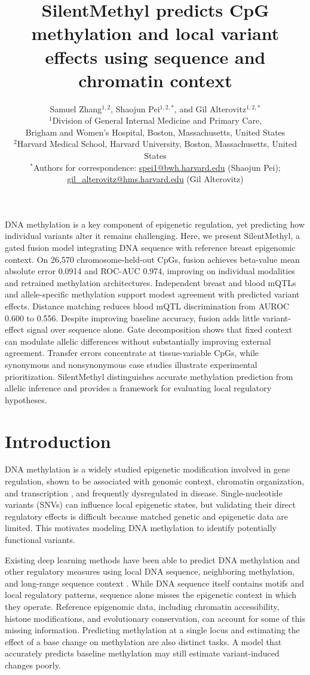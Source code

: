 \documentclass[11pt,letterpaper,twocolumn]{article}
\title{\LARGE\bfseries SilentMethyl predicts CpG methylation and local variant effects using sequence and chromatin context}
\author{%
  Samuel Zhang$^{1,2}$, Shaojun Pei$^{1,2,*}$, and Gil Alterovitz$^{1,2,*}$ \\[0.5em]
  \small $^{1}$Division of General Internal Medicine and Primary Care, \\
  \small Brigham and Women's Hospital, Boston, Massachusetts, United States \\
  \small $^{2}$Harvard Medical School, Harvard University, Boston, Massachusetts, United States \\[0.5em]
  \small $^{*}$Authors for correspondence: \href{mailto:spei1@bwh.harvard.edu}{spei1@bwh.harvard.edu} (Shaojun Pei); \\
  \small \href{mailto:gil\_alterovitz@hms.harvard.edu}{gil\_alterovitz@hms.harvard.edu} (Gil Alterovitz)
}
\date{}
\renewenvironment{abstract}{%
  \section*{\abstractname}\vspace{-0.25em}
}{\par\vspace{0.6em}}
\begin{document}
\maketitle
\begin{abstract}
DNA methylation is a key component of epigenetic regulation, yet predicting how individual variants alter it remains challenging. Here, we present SilentMethyl, a gated fusion model integrating DNA sequence with reference breast epigenomic context. On 26,570 chromosome-held-out CpGs, fusion achieves beta-value mean absolute error 0.0914 and ROC-AUC 0.974, improving on individual modalities and retrained methylation architectures. Independent breast and blood mQTLs and allele-specific methylation support modest agreement with predicted variant effects. Distance matching reduces blood mQTL discrimination from AUROC 0.600 to 0.556. Despite improving baseline accuracy, fusion adds little variant-effect signal over sequence alone. Gate decomposition shows that fixed context can modulate allelic differences without substantially improving external agreement. Transfer errors concentrate at tissue-variable CpGs, while synonymous and nonsynonymous case studies illustrate experimental prioritization. SilentMethyl distinguishes accurate methylation prediction from allelic inference and provides a framework for evaluating local regulatory hypotheses.
\end{abstract}

\section{Introduction}
DNA methylation is a widely studied epigenetic modification involved in gene regulation, shown to be associated with genomic context, chromatin organization, and transcription \cite{jones2012functions,schubeler2015function}, and frequently dysregulated in disease. Single-nucleotide variants (SNVs) can influence local epigenetic states, but validating their direct regulatory effects is difficult because matched genetic and epigenetic data are limited. This motivates modeling DNA methylation to identify potentially functional variants.

Existing deep learning methods have been able to predict DNA methylation and other regulatory measures using local DNA sequence, neighboring methylation, and long-range sequence context \cite{angermueller2017deepcpg,zhou2015predicting,avsec2021effective}. While DNA sequence itself contains motifs and local regulatory patterns, sequence alone misses the epigenetic context in which they operate. Reference epigenomic data, including chromatin accessibility, histone modifications, and evolutionary conservation, can account for some of this missing information. Predicting methylation at a single locus and estimating the effect of a base change on methylation are also distinct tasks. A model that accurately predicts baseline methylation may still estimate variant-induced changes poorly.
\end{document}

